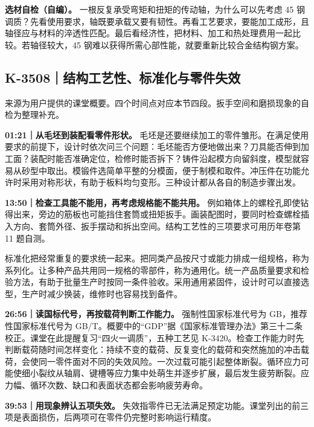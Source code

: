 \documentclass[zihao=5,a4paper,UTF8,fontset=fandol]{ctexart}
\begin{document}
\textbf{选材自检（自编）。} 一根反复承受弯矩和扭矩的传动轴，为什么可以先考虑 45 钢调质？先看使用要求，轴既要承载又要有韧性。再看工艺要求，要能加工成形，且轴径应与材料的淬透性匹配。最后看经济性，把材料、加工和热处理费用一起比较。若轴径较大，45 钢难以获得所需心部性能，就要重新比较合金结构钢方案。





\subsection{K-3508｜结构工艺性、标准化与零件失效}
\label{k-3508}

来源为用户提供的课堂概要。四个时间点对应本节四段。扳手空间和磨损现象的自检为整理补充。


\textbf{01:21｜从毛坯到装配看零件形状。} 毛坯是还要继续加工的零件雏形。在满足使用要求的前提下，设计时依次问三个问题：毛坯能否方便地做出来？刀具能否伸到加工面？装配时能否准确定位，检修时能否拆下？铸件沿起模方向留斜度，模型就容易从砂型中取出。模锻件选简单平整的分模面，便于制模和取件。冲压件在功能允许时采用对称形状，有助于板料均匀变形。三种设计都从各自的制造步骤出发。


\textbf{13:50｜检查工具能不能用，再考虑规格能不能共用。} 例如箱体上的螺栓孔即使钻得出来，旁边的筋板也可能挡住套筒或扭矩扳手。画装配图时，要同时检查螺栓插入方向、套筒外径、扳手摆动和拆出空间。结构工艺性的三项要求可用历年卷第 11 题自测。


标准化把经常重复的要求统一起来。把同类产品按尺寸或能力排成一组规格，称为系列化。让多种产品共用同一规格的零部件，称为通用化。统一产品质量要求和检验方法，有助于批量生产时按同一条件验收。采用通用紧固件，设计时可以直接选型，生产时减少换装，维修时也容易找到备件。


\textbf{26:56｜读国标代号，再按载荷判断工作能力。} 强制性国家标准代号为 GB，推荐性国家标准代号为 GB/T。概要中的“GDP”据《国家标准管理办法》第三十二条校正。课堂在此提醒复习“四火一调质”，五种工艺见 K-3420。检查工作能力时先判断载荷随时间怎样变化：持续不变的载荷、反复变化的载荷和突然施加的冲击载荷，会使同一零件面对不同的失效风险。一次过载可能引起整体断裂。循环应力可能使细小裂纹从轴肩、键槽等应力集中处萌生并逐步扩展，最后发生疲劳断裂。应力幅、循环次数、缺口和表面状态都会影响疲劳寿命。


\textbf{39:53｜用现象辨认五项失效。} 失效指零件已无法满足预定功能。课堂列出的前三项是表面损伤，后两项可在零件仍完整时影响运行精度。
\end{document}
